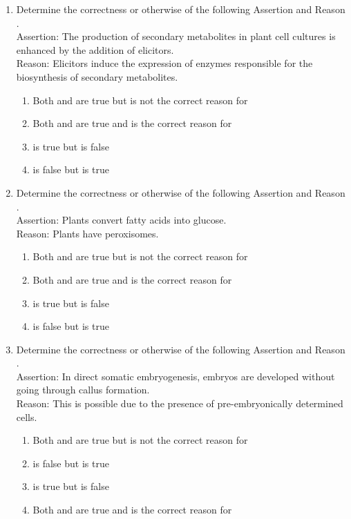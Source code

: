 \documentclass[journal,12pt,onecolumn]{IEEEtran}
\theoremstyle{remark}
\begin{document}
\begin{enumerate}
\item Determine the correctness or otherwise of the following Assertion  and Reason .\\

Assertion: The production of secondary metabolites in plant cell cultures is enhanced by the addition of elicitors.\\
Reason:	Elicitors induce the expression of enzymes responsible for the biosynthesis of secondary metabolites.
\begin{enumerate}
\item 	Both  and  are true but  is not the correct reason for 
\item 	Both  and  are true and  is the correct reason for 
\item 	{} is true but  is false
\item 	{} is false but  is true
\end{enumerate}

\item Determine the correctness or otherwise of the following Assertion  and Reason .\\

Assertion: Plants convert fatty acids into glucose.\\
Reason:	Plants have peroxisomes.
\begin{enumerate}
\item 	Both  and  are true but  is not the correct reason for 
\item 	Both  and  are true and  is the correct reason for 
\item {} is true but  is false
\item 	{} is false but  is true
\end{enumerate}


\item Determine the correctness or otherwise of the following Assertion  and Reason .\\

Assertion: In direct somatic embryogenesis, embryos are developed without going through callus formation.\\
Reason:	This is possible due to the presence of pre-embryonically determined cells.
\begin{enumerate}
\item Both  and  are true but  is not the correct reason for 
\item {} is false but  is true
\item {} is true but  is false
\item Both  and  are true and  is the correct reason for 
\end{enumerate}


\end{enumerate}
\end{document}

